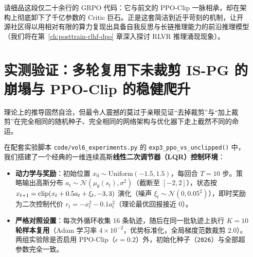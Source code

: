 请细品这段仅二十余行的 GRPO 代码：它与前文的 PPO-Clip 一脉相承，却在架构上彻底卸下了千亿参数的 Critic 巨石。正是这套简洁到近乎苛刻的机制，让开源社区得以用相对有限的算力复现出具备自我反思与长链推理能力的前沿推理模型（我们将在第~\ref{ch:posttrain-rlhf-dpo} 章深入探讨 RLVR 推理涌现现象）。

\section{实测验证：多轮复用下未裁剪 IS-PG 的崩塌与 PPO-Clip 的稳健爬升}
\label{sec:exp-ppo}

理论上的推导固然自洽，但最令人震撼的莫过于亲眼见证“去掉裁剪”与“加上裁剪”在完全相同的随机种子、完全相同的网络架构与优化器下走上截然不同的命运。

在配套实验脚本 \texttt{code/vol6\_experiments.py} 的 \texttt{exp3\_ppo\_vs\_unclipped()} 中，我们搭建了一个经典的一维连续高斯\textbf{线性二次调节器（LQR）控制环境}：
\begin{itemize}
  \item \textbf{动力学与奖励}：初始位置 $x_0 \sim \mathrm{Uniform}(-1.5, 1.5)$，每回合 $T = 10$ 步。策略输出高斯分布 $a_t \sim \mathcal{N}(\mu_\theta(s_t), \sigma^2)$（截断至 $[-2, 2]$），状态按 $x_{t+1} = \operatorname{clip}(x_t + 0.5 a_t + \xi_t, -3, 3)$ 演化（噪声 $\xi_t \sim \mathcal{N}(0, 0.05^2)$），即时奖励为二次控制代价 $r_t = -x_t^2 - 0.1 a_t^2$（理论最优回报接近 $0$）。
  \item \textbf{严格对照设置}：每次外循环收集 16 条轨迹，随后在同一批轨迹上执行 \textbf{$K = 10$ 轮样本复用}（Adam 学习率 $4 \times 10^{-2}$，优势标准化，全局梯度范数裁剪 $2.0$）。两组实验除是否启用 PPO-Clip（$\epsilon = 0.2$）外，初始化种子（\texttt{2026}）与全部超参数完全一致。
\end{itemize}

